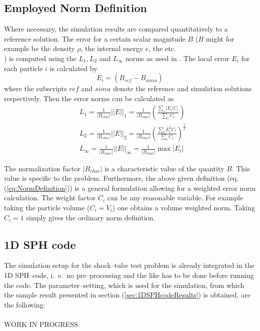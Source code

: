 \documentclass{report}
\newcommand{\norm}[1]{\left|#1\right|}
\newcommand{\nnorm}[1]{\left|\left|#1\right|\right|}
\begin{document}
\subsection{Employed Norm Definition}
\label{sec:employedNormDefinition}
Where necessary, the simulation results are compared quantitatively to a reference solution. The error for a certain scalar magnitude $B$ ($B$ might for example be the density $\rho$, the internal energy $e$, the  etc.\\) is computed using the $L_1,L_2$ and $L_\infty$ norms as used in \cite{Novak2007}. 
The local error $E_i$ for each particle $i$ is calculated by 
\begin{equation}
 E_i=(B_{\mathit{ref}}-B_{\mathit{simu}})
\end{equation}
where the subscripts $ref$ and $simu$ denote the reference and simulation solutions respectively.
Then the error norms can be calculated as
\begin{equation}
\label{eq:NormDefinition}
\begin{split}
 & L_1=\frac{1}{\norm{B_{\mathit{char}}}}\nnorm{E}_1=\frac{1}{\norm{B_{\mathit{char}}}}\left(\frac{\sum_i \norm{E_i} C_i }{\sum_i C_i}\right)\\[0.3cm]
& L_2=\frac{1}{\norm{B_{\mathit{char}}}}\nnorm{E}_2=\frac{1}{\norm{B_{\mathit{char}}}}\left(\frac{\sum_i E^2_i C_i }{\sum_i C_i}\right)^{\frac{1}{2}}\\[0.3cm]
& L_\infty=\frac{1}{\norm{B_{\mathit{char}}}}\nnorm{E}_\infty=\frac{1}{\norm{B_{\mathit{char}}}}\max \norm{E_i}
\end{split}
\end{equation}

The normalization factor $\norm{B_{\mathit{char}}}$ is  a characteristic value of the quantity $B$. This value is specific to the problem. Furthermore, the above given definition (eq. (\ref{eq:NormDefinition})) is a general formulation allowing for a weighted error norm calculation. The weight factor $C_i$ can be any reasonable variable. For example taking the particle volume ($C_i=V_i$) one obtains a volume weighted norm. Taking $C_i=1$ simply gives the ordinary norm definition.


\subsection{1D SPH code}
\label{sec:simuSetup1DSPHcode}
The simulation setup for the shock--tube test problem is already integrated in the 1D SPH--code, i.\ e.\ no pre--processing and the like has to be done before running the code. 
The parameter--setting, which is used for the simulation, from which the sample result presented in section (\ref{sec:1DSPHcodeResults}) is obtained, are the following:
\\
\\
WORK IN PROGRESS
\end{document}
